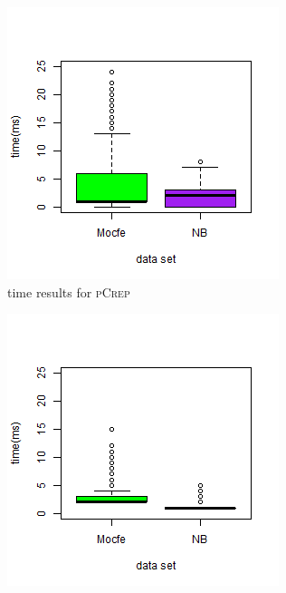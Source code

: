 \documentclass[a4paper,UKenglish,cleveref, autoref, thm-restate,authorcolumns]{lipics-v2019}
\newcommand{\adjDel}{\textsc{pCrep}}
\begin{document}
\begin{figure}
	\centering
	\begin{minipage}{0.48\linewidth}
		\begin{subfigure}[b]{\linewidth}
			\includegraphics*[width=\linewidth]{"plots/time_hpc_filtered_decompTree"}
			\caption{time results for \adjDel}
		\end{subfigure}		
	\end{minipage}
	\begin{minipage}{0.48\linewidth}
		\begin{subfigure}[b]{\linewidth}
			\includegraphics*[width=\linewidth]{"plots/time_hpc_filtered_compDecomp"}

\end{subfigure}
\end{minipage}
\end{figure}
\end{document}
